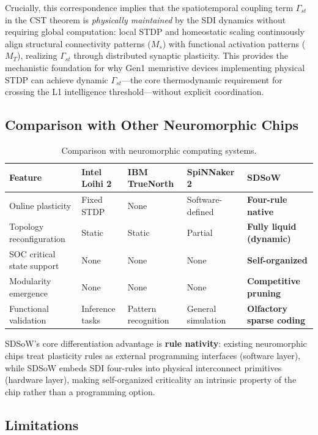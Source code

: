 \documentclass[12pt,a4paper]{article}
\begin{document}
Crucially, this correspondence implies that the spatiotemporal coupling term $\Gamma_{st}$ in the CST theorem is \emph{physically maintained} by the SDI dynamics without requiring global computation: local STDP and homeostatic scaling continuously align structural connectivity patterns ($M_s$) with functional activation patterns ($M_T$), realizing $\Gamma_{st}$ through distributed synaptic plasticity. This provides the mechanistic foundation for why Gen1 memristive devices implementing physical STDP can achieve dynamic $\Gamma_{st}$---the core thermodynamic requirement for crossing the L1 intelligence threshold---without explicit coordination.

\subsection{Comparison with Other Neuromorphic Chips}

\begin{table}[H]
\centering
\caption{Comparison with neuromorphic computing systems.}
\label{tab:hardware}
\begin{tabular}{lllll}
\toprule
\textbf{Feature} & \textbf{Intel Loihi 2} & \textbf{IBM TrueNorth} & \textbf{SpiNNaker 2} & \textbf{SDSoW} \\
\midrule
Online plasticity & Fixed STDP & None & Software-defined & \textbf{Four-rule native} \\
Topology reconfiguration & Static & Static & Partial & \textbf{Fully liquid (dynamic)} \\
SOC critical state support & None & None & None & \textbf{Self-organized} \\
Modularity emergence & None & None & None & \textbf{Competitive pruning} \\
Functional validation & Inference tasks & Pattern recognition & General simulation & \textbf{Olfactory sparse coding} \\
\bottomrule
\end{tabular}
\end{table}

SDSoW's core differentiation advantage is \textbf{rule nativity}: existing neuromorphic chips treat plasticity rules as external programming interfaces (software layer), while SDSoW embeds SDI four-rules into physical interconnect primitives (hardware layer), making self-organized criticality an intrinsic property of the chip rather than a programming option.

\subsection{Limitations}
\end{document}
